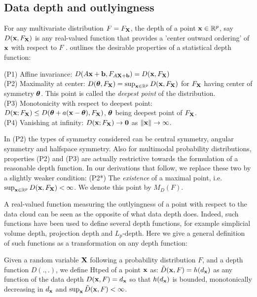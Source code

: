 \documentclass[fleqn,11pt]{article}
\begin{document}
\subsection{Data depth and outlyingness}
For any multivariate distribution $F = F_{\mathbf{X}}$, the depth of a point ${\bf{x}} \in \mathbb{R}^p$, say $D({\bf{x}}, F_{\mathbf{X}})$ is any real-valued function that provides a 'center outward ordering' of ${\bf{x}}$ with respect to $F$ \citep{zuo00}. \cite{liu90} outlines the desirable properties of a statistical depth function:

\noindent
(P1) Affine invariance: $D(A{\bf{x}} + {\bf{b}}, F_{A{\mathbf{X}}+{\bf{b}}}) = D({\bf{x}}, F_{\mathbf{X}})$\\
(P2) Maximality at center: $D({\boldsymbol{\theta}}, F_{\mathbf{X}}) = \sup_{{\bf{x}}\in \mathbb{R}^p} D({\bf{x}}, F_{\mathbf{X}})$ for $F_{\mathbf{X}}$ having center of symmetry ${\boldsymbol{\theta}}$. This point is called the \textit{deepest point} of the distribution.\\
(P3) Monotonicity with respect to deepest point: $D({\bf{x}}; F_{\mathbf{X}}) \leq D({\boldsymbol{\theta}} + a({\bf{x}} - {\boldsymbol{\theta}}), F_{\mathbf{X}})$, ${\boldsymbol{\theta}}$ being deepest point of $F_{\mathbf{X}}$.\\
(P4) Vanishing at infinity: $D({\bf{x}}; F_{\mathbf{X}}) \rightarrow \bf0$ as $\|{\bf{x}}\| \rightarrow \infty $.

In (P2) the types of symmetry considered can be central symmetry, angular symmetry and halfspace symmetry. Also for multimodal probability distributions, properties (P2) and (P3) are actually restrictive towards the formulation of a reasonable depth function. In our derivations that follow, we replace these two by a slightly weaker condition: (P2*) The \textit{existence} of a maximal point, i.e. $ \sup_{{\bf{x}}\in \mathbb{R}^p} D({\bf{x}}, F_{\mathbf{X}}) < \infty $. We denote this point by $M_D(F)$.

A real-valued function measuring the outlyingness of a point with respect to the data cloud can be seen as the opposite of what data depth does. Indeed, such functions have been used to define several depth functions, for example simplicial volume depth, projection depth and $L_p$-depth. Here we give a general definition of such functions as a transformation on any depth function:

\begin{Definition}
Given a random variable ${\mathbf{X}}$ following a probability distribution $F$, and a depth function $D(.,.)$, we define Htped of a point ${\bf{x}}$ as: $\tilde D({\bf{x}}, F) = h(d_{\bf{x}})$ as any function of the data depth $D({\bf{x}}, F) = d_{\bf{x}}$ so that $h(d_{\bf{x}})$ is bounded, monotonically decreasing in $d_{\bf{x}}$ and $\sup_{\bf{x}} \tilde D({\bf{x}}, F) < \infty$.
\end{Definition}
\end{document}
